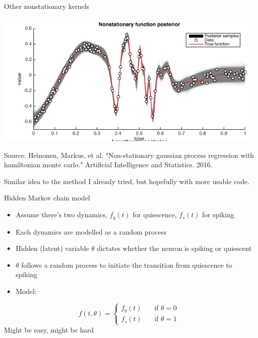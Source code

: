 \documentclass[presentation]{beamer}
\begin{document}
\begin{frame}[plain,label={sec:orgaa1f207}]{Other nonstationary kernels}
\begin{center}
\includegraphics[width=.9\linewidth]{./nonstationary.png}
\end{center}

Source: Heinonen, Markus, et al. "Non-stationary gaussian process regression with hamiltonian monte carlo." Artificial Intelligence and Statistics. 2016.

\vfill

Similar idea to the method I already tried, but hopefully with more usable code.
\end{frame}

\begin{frame}[label={sec:orgde41d44}]{Hidden Markov chain model}
\begin{itemize}
\item Assume there's two dynamics, \(f_q(t)\) for quiescence, \(f_s(t)\) for spiking
\item Each dynamics are modelled as a random process
\item Hidden (latent) variable \(\theta\) dictates whether the neuron is spiking or quiescent
\item \(\theta\) follows a random process to initiate the transition from quiescence to spiking
\item Model:
\end{itemize}
\begin{equation}
f(t,\theta) = 
\begin{cases}
f_q(t) & \quad \text{if } \theta=0\\
f_s(t) & \quad \text{if } \theta=1
\end{cases}
\end{equation}
    \vfill 
Might be easy, might be hard
\end{frame}
\end{document}
